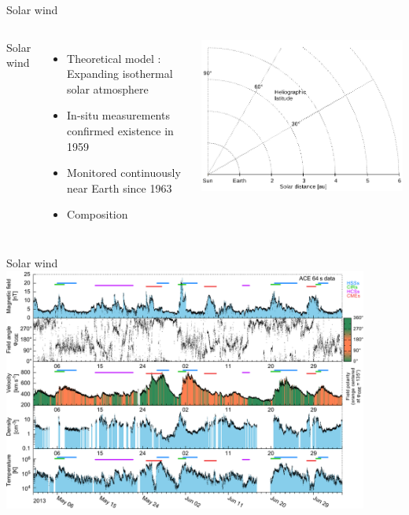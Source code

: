 \begin{frame}[plain,c]{Solar wind}{}
	\begin{columns}[c]
		
		Solar wind
		\begin{itemize}
			\item Theoretical model \citep{Parker1958}:\\
				Expanding isothermal solar atmosphere
			\item In-situ measurements confirmed existence in 1959
			\item Monitored continuously near Earth since 1963
			\item Composition
		\end{itemize}
		
		
		\includegraphics[width=\textwidth]{../talk_figures/helios_ulysses_voyager/helios_ulysses_voyager.pdf}
		
	\end{columns}
\end{frame}
\begin{frame}[plain,c]{Solar wind}{}
	\centering
	\includegraphics[width=0.9\textwidth]{../figures_of_mine/gnuplots/ACE_64s_v7_thesis_CIRs_2013-5-1_65_plot.pdf}
	
\end{frame}
